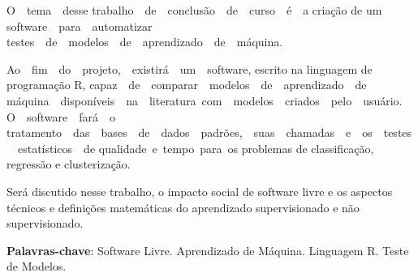 


\begin{resumo}

O  tema  desse trabalho  de  conclusão  de  curso  é  a criação de um software  para  automatizar testes  de  modelos  de  aprendizado  de  máquina. 

Ao  fim  do  projeto,  existirá  um  software, escrito na linguagem de programação R, capaz  de  comparar  modelos  de  aprendizado  de máquina  disponíveis  na  literatura com  modelos  criados  pelo  usuário.  O  software  fará  o tratamento  das  bases  de  dados  padrões,  suas  chamadas  e  os  testes  estatísticos  de qualidade e tempo para os problemas de classificação, regressão e clusterização.

Será discutido nesse trabalho, o impacto social de software livre e os aspectos técnicos e definições matemáticas do aprendizado supervisionado e não supervisionado.

\textbf{Palavras-chave}: Software Livre. Aprendizado de Máquina. Linguagem R. Teste de Modelos.

 

\end{resumo}



